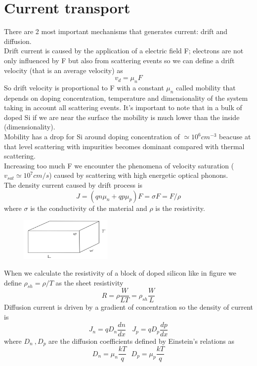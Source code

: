\section{Current transport}
There are 2 most important mechanisms that generates current: drift and diffusion.\\
Drift current is caused by the application of a electric field F; electrons are not only influenced by F but also from scattering events so we can define a drift velocity (that is an average velocity) as 
\begin{equation}
v_d=\mu_n F
\end{equation}
So drift velocity is proportional to F with a constant $\mu_n$ called mobility that depends on doping concentration, temperature and dimensionality of the system taking in account all scattering events. It's important to note that in a bulk of doped Si if we are near the surface the mobility is much lower than the inside (dimensionality).\\
Mobility has a drop for Si around doping concentration of $\simeq 10^6 cm^{-3}$ beacuse at that level scattering with impurities becomes dominant compared with thermal scattering.\\
Increasing too much F we encounter the phenomena of velocity saturation ($v_{sat}\simeq 10^7 cm/s$) caused by scattering with high energetic optical phonons.\\
The density current caused by drift process is 
\begin{equation}
J=(qn\mu_n + qp\mu_p)F=\sigma F=F/\rho
\end{equation}
where $\sigma$ is the conductivity of the material and $\rho$ is the resistivity.\\

\begin{figure}
\includegraphics[width=0.4\textwidth]{shrho.png}
\end{figure}

When we calculate the resistivity of a block of doped silicon like in figure we define $\rho_{sh}=\rho/T$ as the sheet resistivity
\begin{equation}
R=\rho\frac{W}{LT}=\rho_{sh}\frac{W}{L} 
\end{equation}
Diffusion current is driven by a gradient of concentration so the density of current is 
\begin{equation}
J_n=qD_n\frac{dn}{dx} \ \ \ \ J_p=qD_p\frac{dp}{dx}
\end{equation}
where $D_n\ ,D_p$ are the diffusion coefficients defined by Einstein's relations as 
\begin{equation}
D_n=\mu_n\frac{kT}{q}\ \ \ D_p=\mu_p\frac{kT}{q}
\end{equation}
\newline
